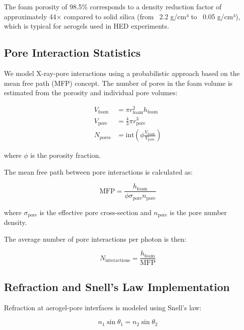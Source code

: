 \documentclass[twocolumn]{aastex701}
\begin{document}
The foam porosity of 98.5\% corresponds to a density reduction factor of approximately 44× compared to solid silica (from ~2.2 g/cm³ to ~0.05 g/cm³), which is typical for aerogels used in HED experiments.

\subsection{Pore Interaction Statistics}

We model X-ray-pore interactions using a probabilistic approach based on the mean free path (MFP) concept. The number of pores in the foam volume is estimated from the porosity and individual pore volumes:

\begin{align}
V_{\text{foam}} &= \pi r_{\text{foam}}^2 h_{\text{foam}} \\
V_{\text{pore}} &= \frac{4}{3}\pi r_{\text{pore}}^3 \\
N_{\text{pores}} &= \text{int}\left(\phi \frac{V_{\text{foam}}}{V_{\text{pore}}}\right)
\end{align}

where $\phi$ is the porosity fraction.

The mean free path between pore interactions is calculated as:

\begin{equation}
\text{MFP} = \frac{h_{\text{foam}}}{\phi \sigma_{\text{pore}} n_{\text{pore}}}
\end{equation}

where $\sigma_{\text{pore}}$ is the effective pore cross-section and $n_{\text{pore}}$ is the pore number density.

The average number of pore interactions per photon is then:

\begin{equation}
\label{eq: MFP}
    N_{\text{interactions}} = \frac{h_{\text{foam}}}{\text{MFP}}
\end{equation}

\subsection{Refraction and Snell's Law Implementation}

Refraction at aerogel-pore interfaces is modeled using Snell's law:

\begin{equation}
\label{eq: snell's law}
    n_1 \sin \theta_1 = n_2 \sin \theta_2
\end{equation}
\end{document}
